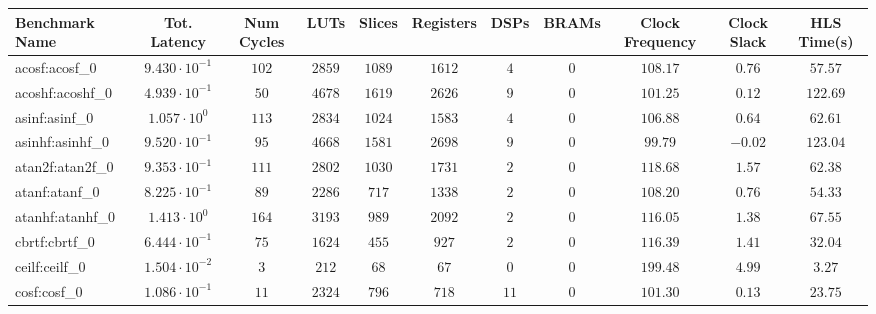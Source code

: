 \begin{tabular}{|l|c|c|c|c|c|c|c|c|c|c|}
\hline
Benchmark Name               & Tot. Latency            & Num Cycles & LUTs      & Slices    & Registers & DSPs    & BRAMs & Clock Frequency & Clock Slack & HLS Time(s) \\
\hline
acosf:acosf\_0               & $ 9.430 \cdot 10^{-1} $ & $ 102    $ & $ 2859  $ & $ 1089  $ & $ 1612  $ & $ 4   $ & $ 0 $ & $ 108.17      $ & $ 0.76    $ & $ 57.57   $ \\
acoshf:acoshf\_0             & $ 4.939 \cdot 10^{-1} $ & $ 50     $ & $ 4678  $ & $ 1619  $ & $ 2626  $ & $ 9   $ & $ 0 $ & $ 101.25      $ & $ 0.12    $ & $ 122.69  $ \\
asinf:asinf\_0               & $ 1.057 \cdot 10^{0}  $ & $ 113    $ & $ 2834  $ & $ 1024  $ & $ 1583  $ & $ 4   $ & $ 0 $ & $ 106.88      $ & $ 0.64    $ & $ 62.61   $ \\
asinhf:asinhf\_0             & $ 9.520 \cdot 10^{-1} $ & $ 95     $ & $ 4668  $ & $ 1581  $ & $ 2698  $ & $ 9   $ & $ 0 $ & $ 99.79       $ & $ -0.02   $ & $ 123.04  $ \\
atan2f:atan2f\_0             & $ 9.353 \cdot 10^{-1} $ & $ 111    $ & $ 2802  $ & $ 1030  $ & $ 1731  $ & $ 2   $ & $ 0 $ & $ 118.68      $ & $ 1.57    $ & $ 62.38   $ \\
atanf:atanf\_0               & $ 8.225 \cdot 10^{-1} $ & $ 89     $ & $ 2286  $ & $ 717   $ & $ 1338  $ & $ 2   $ & $ 0 $ & $ 108.20      $ & $ 0.76    $ & $ 54.33   $ \\
atanhf:atanhf\_0             & $ 1.413 \cdot 10^{0}  $ & $ 164    $ & $ 3193  $ & $ 989   $ & $ 2092  $ & $ 2   $ & $ 0 $ & $ 116.05      $ & $ 1.38    $ & $ 67.55   $ \\
cbrtf:cbrtf\_0               & $ 6.444 \cdot 10^{-1} $ & $ 75     $ & $ 1624  $ & $ 455   $ & $ 927   $ & $ 2   $ & $ 0 $ & $ 116.39      $ & $ 1.41    $ & $ 32.04   $ \\
ceilf:ceilf\_0               & $ 1.504 \cdot 10^{-2} $ & $ 3      $ & $ 212   $ & $ 68    $ & $ 67    $ & $ 0   $ & $ 0 $ & $ 199.48      $ & $ 4.99    $ & $ 3.27    $ \\
cosf:cosf\_0                 & $ 1.086 \cdot 10^{-1} $ & $ 11     $ & $ 2324  $ & $ 796   $ & $ 718   $ & $ 11  $ & $ 0 $ & $ 101.30      $ & $ 0.13    $ & $ 23.75   $ \\

\end{tabular}
